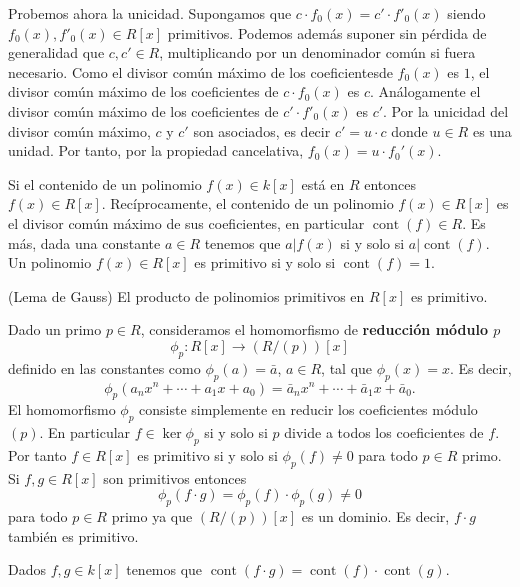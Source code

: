 Probemos ahora la unicidad. Supongamos que
\(c\cdot f_0(x)=c'\cdot f'_0(x)\) siendo \(f_0(x),f'_0(x)\in R[x]\)
primitivos. Podemos además suponer sin pérdida de generalidad que
\(c,c'\in R\), multiplicando por un denominador común si fuera
necesario. Como el divisor común máximo de los coeficientesde \(f_0(x)\)
es \(1\), el divisor común máximo de los coeficientes de
\(c\cdot f_0(x)\) es \(c\). Análogamente el divisor común máximo de los
coeficientes de \(c'\cdot f'_0(x)\) es \(c'\). Por la unicidad del
divisor común máximo, \(c\) y \(c'\) son asociados, es decir
\(c'=u\cdot c\) donde \(u\in R\) es una unidad. Por tanto, por la
propiedad cancelativa, \(f_0(x)=u\cdot f_0'(x)\). 


Si el contenido de un polinomio \(f(x)\in k[x]\) está en \(R\) entonces
\(f(x)\in R[x]\). Recíprocamente, el contenido de un polinomio
\(f(x)\in R[x]\) es el divisor común máximo de sus coeficientes, en
particular \(\operatorname{cont}(f)\in R\). Es más, dada una constante
\(a\in R\) tenemos que \(a|f(x)\) si y solo si
\(a|\operatorname{cont}(f)\). Un polinomio \(f(x)\in R[x]\) es primitivo
si y solo si \(\operatorname{cont}(f)=1\). 

\textrm{\normalfont (Lema de Gauss)} El producto de
polinomios primitivos en \(R[x]\) es primitivo. 


Dado un primo \(p\in R\), consideramos el homomorfismo de
\textbf{reducción módulo \(p\)}
\[\phi_p\colon R[x]\longrightarrow (R/(p))[x]\] definido en las
constantes como \(\phi_p(a)=\bar a\), \(a\in R\), tal que
\(\phi_p(x)=x\). Es decir,
\[\phi_p(a_nx^n+\cdots+a_1x+a_0)=\bar a_nx^n+\cdots+\bar a_1x+\bar a_0.\]
El homomorfismo \(\phi_p\) consiste simplemente en reducir los
coeficientes módulo \((p)\). En particular \(f\in \ker \phi_p\) si y
solo si \(p\) divide a todos los coeficientes de \(f\). Por tanto
\(f\in R[x]\) es primitivo si y solo si \(\phi_p(f)\neq 0\) para todo
\(p\in R\) primo. Si \(f,g\in R[x]\) son primitivos entonces
\[\phi_p(f\cdot g)=\phi_p(f)\cdot \phi_p(g)\neq 0\] para todo \(p\in R\)
primo ya que \((R/(p))[x]\) es un dominio. Es decir, \(f\cdot g\)
también es primitivo. 


Dados \(f,g\in k[x]\) tenemos que
\(\operatorname{cont}(f\cdot g)=\operatorname{cont}(f)\cdot \operatorname{cont}(g)\).

